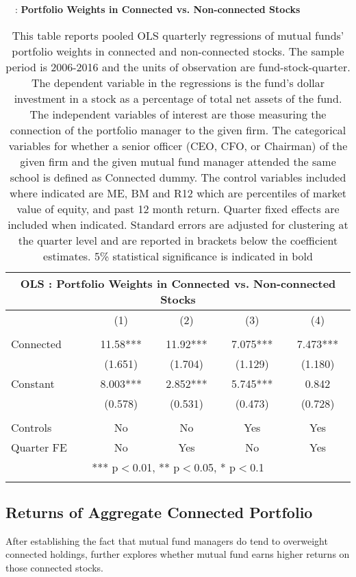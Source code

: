 \documentclass[11pt]{article}
\begin{document}
\begin{doublespace}
\begin{table}
\centering
\caption{ \ \ : \large \bf Portfolio Weights in Connected vs. Non-connected Stocks }
\begin{tabular}{lcccc}
\multicolumn{5}{c}{OLS : Portfolio Weights in Connected vs. Non-connected Stocks} \\ \hline
 & (1) & (2) & (3) & (4) \\ \hline
 &  &  &  &  \\
Connected & 11.58*** & 11.92*** & 7.075*** & 7.473*** \\
 & (1.651) & (1.704) & (1.129) & (1.180) \\
Constant & 8.003*** & 2.852*** & 5.745*** & 0.842 \\
 & (0.578) & (0.531) & (0.473) & (0.728) \\
 &  &  &  &  \\
Controls & No & No & Yes & Yes \\
 Quarter FE & No & Yes & No & Yes \\ \hline
\multicolumn{5}{c}{ *** p$<$0.01, ** p$<$0.05, * p$<$0.1} \\
\label{table:3}
\end{tabular}
\caption*{This table reports pooled OLS quarterly regressions of mutual funds’ portfolio weights in connected and non-connected stocks. The sample
period is 2006-2016 and the units of observation are fund-stock-quarter. The dependent variable in the regressions is the fund’s dollar investment
in a stock as a percentage of total net assets of the fund. The independent variables of interest are those measuring the connection of the
portfolio manager to the given firm. The categorical variables for whether a senior officer (CEO, CFO, or Chairman) of the
given firm and the given mutual fund manager attended the same school is defined as Connected dummy. The control variables included where indicated are ME, BM and R12 which are percentiles of market value of equity, and past 12 month return. Quarter fixed effects are included when indicated. Standard errors are adjusted for clustering at the quarter level and are reported in brackets below the coefficient estimates. 5\% statistical significance is indicated in bold}
\end{table}





\subsection{Returns of Aggregate Connected Portfolio}
After establishing the fact that mutual fund managers do tend to overweight connected holdings, \cite{cohen2008small} further explores whether mutual fund earns higher returns on those connected stocks. 


\end{doublespace}
\end{document}
